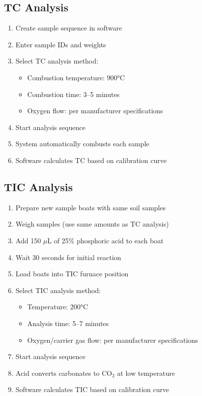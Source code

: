 \documentclass[11pt,a4paper]{article}\usepackage[]{graphicx}\usepackage[]{xcolor}
\begin{document}
\subsection{TC Analysis}
\begin{enumerate}[noitemsep]
    \item Create sample sequence in software
    \item Enter sample IDs and weights
    \item Select TC analysis method:
    \begin{itemize}
        \item Combustion temperature: 900°C
        \item Combustion time: 3--5 minutes
        \item Oxygen flow: per manufacturer specifications
    \end{itemize}
    \item Start analysis sequence
    \item System automatically combusts each sample
    \item Software calculates TC based on calibration curve
\end{enumerate}

\subsection{TIC Analysis}
\begin{enumerate}[noitemsep]
    \item Prepare new sample boats with same soil samples
    \item Weigh samples (use same amounts as TC analysis)
    \item Add 150 $\mu$L of 25\% phosphoric acid to each boat
    \item Wait 30 seconds for initial reaction
    \item Load boats into TIC furnace position
    \item Select TIC analysis method:
    \begin{itemize}
        \item Temperature: 200°C
        \item Analysis time: 5--7 minutes
        \item Oxygen/carrier gas flow: per manufacturer specifications
    \end{itemize}
    \item Start analysis sequence
    \item Acid converts carbonates to CO$_2$ at low temperature
    \item Software calculates TIC based on calibration curve
\end{enumerate}
\end{document}
